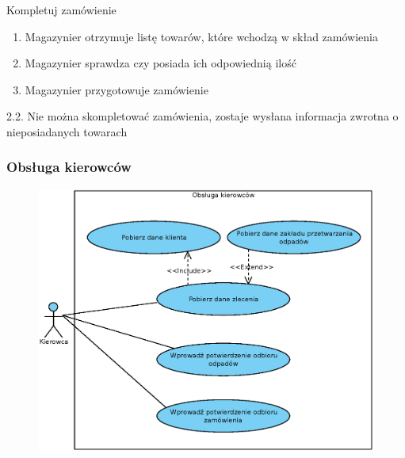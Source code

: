 	\begin{usecase}{Kompletuj zamówienie}
		\author{Arkadiusz Socha} 
		\maketitle
\begin{scenario}
 
			\begin{enumerate}
				\item Magazynier otrzymuje listę towarów, które wchodzą w skład zamówienia
				\item Magazynier sprawdza czy posiada ich odpowiednią ilość
				\item Magazynier przygotowuje zamówienie
			\end{enumerate}
		\end{scenario}
\begin{extensions}
		2.2. Nie można skompletować zamówienia, zostaje wysłana informacja zwrotna o nieposiadanych towarach\\
	\end{extensions}
\end{usecase}

\subsubsection{Obsługa kierowców}

	\begin{figure}[H]
		\centering
		\includegraphics[width=.8\textwidth]{img/UC/kierowcy.eps}
	\end{figure}

